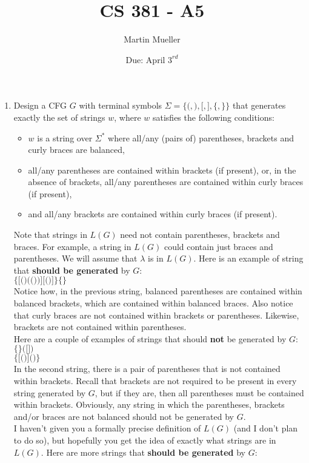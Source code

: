 \documentclass[11pt letter]{article}
\title{CS 381 - A5}
\author{Martin Mueller}
\date{Due: April $3^{rd}$}
\begin{document}
	\maketitle
	\begin{enumerate}
		\item Design a CFG $G$ with terminal symbols $\Sigma = \{ \texttt{(}, \texttt{)}, \texttt{[}, \texttt{]}, \texttt{\{}, \texttt{\}} \}$ that generates exactly the set of strings $w$, where $w$ satisfies the following conditions:
		\begin{itemize}
			\item $w$ is a string over $\Sigma^*$ where all/any (pairs of) parentheses, brackets and curly braces are balanced,
			\item all/any parentheses are contained within brackets (if present), or, in the absence of brackets, all/any parentheses are contained within curly braces (if present),
			\item and all/any brackets are contained within curly braces (if present).
		\end{itemize}
		Note that strings in $L(G)$ need not contain parentheses, brackets and braces.  For example, a string in $L(G)$ could contain just braces and parentheses. We will assume that $\lambda$ is in $L(G)$. Here is an example of string that \textbf{should be generated} by $G$: \\
		$\texttt{\{[()(())][()]\}\{\}}$ \\
		Notice how, in the previous string, balanced parentheses are contained within balanced brackets, which are contained within balanced braces. Also notice that curly braces are not contained within brackets or parentheses. Likewise, brackets are not contained within parentheses. \\
		Here are a couple of examples of strings that should \textbf{not} be generated by $G$: \\
		$\texttt{\{\}([])}$ \\
		$\texttt{\{[()]()\}}$ \\
		In the second string, there is a pair of parentheses that is not contained within brackets. Recall that brackets are not required to be present in every string generated by $G$, but if they are, then all parentheses must be contained within brackets. Obviously, any string in which the parentheses, brackets and/or braces are not balanced should not be generated by $G$. \\
		I haven't given you a formally precise definition of $L(G)$ (and I don't plan to do so), but hopefully you get the idea of exactly what strings are in $L(G)$.  Here are more strings that \textbf{should be generated} by $G$: \\

\end{enumerate}
\end{document}
